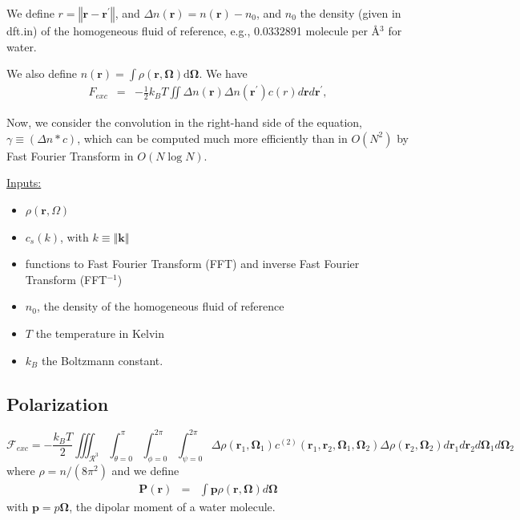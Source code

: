 We define $r=\left\Vert \bm{r}-\bm{r}^{\prime}\right\Vert $, and
$\Delta n\left(\bm{r}\right)=n\left(\bm{r}\right)-n_{0}$, and $n_{0}$
the density (given in dft.in) of the homogeneous fluid of reference,
e.g., 0.0332891 molecule per \AA$^3$ for water.

We also define $n\left(\bm{r}\right)=\int\rho(\bm{r},\boldsymbol{\Omega})\mbox{d}\boldsymbol{\Omega}$.
We have 
\begin{eqnarray}
F_{exc} & = & -\frac{1}{2}k_{B}T\iint\Delta n\left(\boldsymbol{r}\right)\Delta n\left(\boldsymbol{r}^{\prime}\right)c\left(r\right)d\bm{r}d\bm{r}^{\prime},
\end{eqnarray}


Now, we consider the convolution in the right-hand side of the equation,
$\gamma\equiv\left(\Delta n*c\right)$, which can be computed much more
efficiently than in $O\left(N^{2}\right)$ by Fast Fourier Transform
in $O\left(N\log N\right)$.

\uline{Inputs:}
\begin{itemize}
\item $\rho\left(\bm{r},\Omega\right)$
\item $c_{s}\left(k\right)$, with $k\equiv\left\Vert \bm{k}\right\Vert $
\item functions to Fast Fourier Transform (FFT) and inverse Fast Fourier
Transform (FFT$^{-1}$)
\item $n_{0}$, the density of the homogeneous fluid of reference
\item $T$ the temperature in Kelvin
\item $k_{B}$ the Boltzmann constant.
\end{itemize}

\subsection{Polarization}

\begin{equation}
\mathcal{F}_{exc}=-\frac{k_{B}T}{2}\iiint_{\mathcal{R}^{3}}\int_{\theta=0}^{\pi}\int_{\phi=0}^{2\pi}\int_{\psi=0}^{2\pi}\Delta\rho\left(\bm{r}_{1},\bm{\Omega}_{1}\right)c^{\left(2\right)}\left(\bm{r}_{1},\bm{r}_{2},\bm{\Omega}_{1},\bm{\Omega}_{2}\right)\Delta\rho\left(\bm{r}_{2},\bm{\Omega}_{2}\right)d\bm{r}_{1}d\bm{r}_{2}d\bm{\Omega}_{1}d\bm{\Omega}_{2}
\end{equation}
where $\rho=n/\left(8\pi^{2}\right)$ and we define 
\begin{eqnarray}
\bm{P}\left(\bm{r}\right) & = & \int\bm{p}\rho\left(\bm{r},\bm{\Omega}\right)d\bm{\Omega}
\end{eqnarray}
with $\bm{p}=p\bm{\Omega}$, the dipolar moment of a water molecule.


